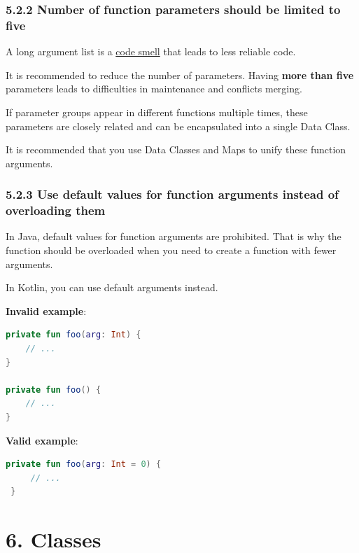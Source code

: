 {{{{\subsubsection*{\textbf{5.2.2 Number of function parameters should be limited to five}}
\leavevmode\newline



A long argument list is a \href{https://en.wikipedia.org/wiki/Code_smell}{code smell} that leads to less reliable code.

It is recommended to reduce the number of parameters. Having \textbf{more than five} parameters leads to difficulties in maintenance and conflicts merging.

If parameter groups appear in different functions multiple times, these parameters are closely related and can be encapsulated into a single Data Class.

It is recommended that you use Data Classes and Maps to unify these function arguments.



\subsubsection*{\textbf{5.2.3 Use default values for function arguments instead of overloading them}}
\leavevmode\newline

In Java, default values for function arguments are prohibited. That is why the function should be overloaded when you need to create a function with fewer arguments.

In Kotlin, you can use default arguments instead.



\textbf{Invalid example}:

\begin{lstlisting}[language=Kotlin]
private fun foo(arg: Int) {
    // ...
}

private fun foo() {
    // ...
}
\end{lstlisting}


\textbf{Valid example}:

\begin{lstlisting}[language=Kotlin]
 private fun foo(arg: Int = 0) {
     // ...
 }
\end{lstlisting}
\section*{\textbf{6. Classes}}

}}}}
